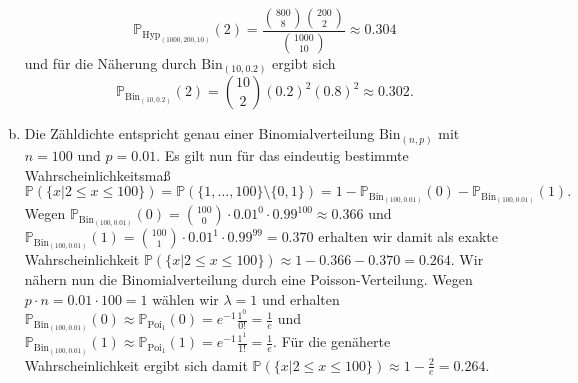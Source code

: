 \documentclass{article}
\newcommand{\IP}{\mathbb{P}}
\begin{document}
\begin{enumerate}[(a)]
        \[
            \scriptstyle{\IP}_{\text{Hyp}_{(1000, 200, 10)}}(2) = \frac{\binom{800}{8}\binom{200}{2}}{\binom{1000}{10}} \approx 0.304
        \] und für die Näherung durch $\text{Bin}_{(10,0.2)}$ ergibt sich
        \[
            \scriptstyle{\IP}_{\text{Bin}_{(10, 0.2)}}(2) = \binom{10}{2} (0.2)^2 (0.8)^2 \approx 0.302.
        \]
        \item Die Zähldichte entspricht genau einer Binomialverteilung $\text{Bin}_{(n, p)}$ mit $n = 100$ und $p = 0.01$. Es gilt nun für das eindeutig bestimmte Wahrscheinlichkeitsmaß 
        \[
            \IP(\{x | 2 \leq x \leq 100\}) = \IP(\{1,\dots, 100\} \setminus \{0,1\}) = 1 - \scriptstyle{\IP}_{\text{Bin}_{(100, 0.01)}}(0) - \scriptstyle{\IP}_{\text{Bin}_{(100, 0.01)}}(1).
        \]
        Wegen $\scriptstyle{\IP}_{\text{Bin}_{(100, 0.01)}}(0) = \binom{100}{0} \cdot 0.01^0 \cdot 0.99^100 \approx 0.366$ und $\scriptstyle{\IP}_{\text{Bin}_{(100, 0.01)}}(1) = \binom{100}{1} \cdot 0.01^1 \cdot 0.99^99 = 0.370$
        erhalten wir damit als exakte Wahrscheinlichkeit $\IP(\{x | 2 \leq x \leq 100\}) \approx 1 - 0.366 - 0.370 = 0.264$.
        Wir nähern nun die Binomialverteilung durch eine Poisson-Verteilung. Wegen $p \cdot n = 0.01 \cdot 100 = 1$ wählen wir $\lambda = 1$ und erhalten $\scriptstyle{\IP}_{\text{Bin}_{(100, 0.01)}}(0) \approx \scriptstyle{\IP}_{\text{Poi}_1}(0) = e^{-1}\frac{1^0}{0!} = \frac{1}{e}$ und $\scriptstyle{\IP}_{\text{Bin}_{(100, 0.01)}}(1) \approx \scriptstyle{\IP}_{\text{Poi}_1}(1) = e^{-1}\frac{1^1}{1!} = \frac{1}{e}$. Für die genäherte Wahrscheinlichkeit ergibt sich damit $\IP(\{x | 2 \leq x \leq 100\}) \approx 1 - \frac{2}{e} = 0.264$.
    \end{enumerate}
\end{document}
